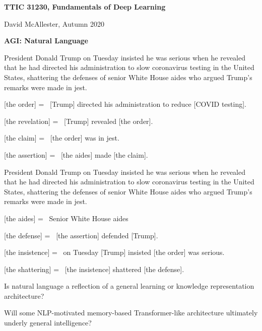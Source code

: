 

\def\entity#1{\vfill {[#1] =~}}



{\Huge

  \centerline{\bf TTIC 31230, Fundamentals of Deep Learning}
  \bigskip
  \centerline{David McAllester, Autumn 2020}

\vfill
\centerline{\bf AGI: Natural Language}
  \vfill
  \vfill


{\huge
President Donald Trump on Tuesday insisted he was serious when he %
revealed that he had directed his administration to slow coronavirus %
testing in the United States, shattering the defenses of senior White %
House aides who argued Trump’s remarks were made in jest. %

\entity{the order} [Trump] directed his administration to reduce [{\large COVID} testing].

\entity{the revelation} [Trump] revealed [the order].

\entity{the claim} [the order] was in jest.

\entity{the assertion} [the aides] made [the claim].
}


{\huge
President Donald Trump on Tuesday insisted he was serious when he %
revealed that he had directed his administration to slow coronavirus %
testing in the United States, shattering the defenses of senior White %
House aides who argued Trump’s remarks were made in jest. %

\entity{the aides} Senior White House aides

\entity{the defense} [the assertion] defended [Trump].

\entity{the insistence} on Tuesday [Trump] insisted [the order] was serious.

\entity{the shattering} [the insistence] shattered [the defense].
}


Is natural language a reflection of a general learning or knowledge representation architecture?

\vfill
Will some NLP-motivated memory-based Transformer-like architecture ultimately underly general intelligence?


}
